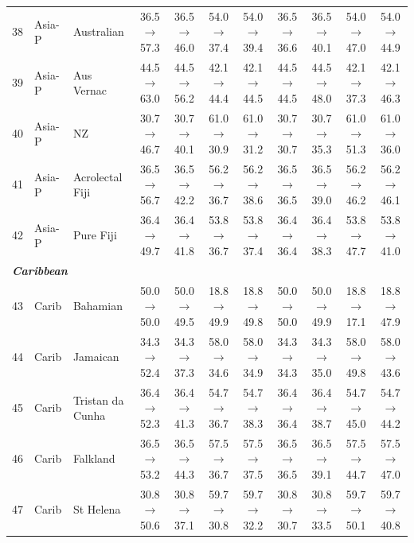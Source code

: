 \begin{table}[t]
{\begin{tabular}{rll c c c c c c c c}
38 & Asia-P & Australian & 36.5$\rightarrow$57.3 & 36.5$\rightarrow$46.0 & 54.0$\rightarrow$37.4 & 54.0$\rightarrow$39.4 & 36.5$\rightarrow$36.6 & 36.5$\rightarrow$40.1 & 54.0$\rightarrow$47.0 & 54.0$\rightarrow$44.9 \\
39 & Asia-P & Aus Vernac & 44.5$\rightarrow$63.0 & 44.5$\rightarrow$56.2 & 42.1$\rightarrow$44.4 & 42.1$\rightarrow$44.5 & 44.5$\rightarrow$44.5 & 44.5$\rightarrow$48.0 & 42.1$\rightarrow$37.3 & 42.1$\rightarrow$46.3 \\
40 & Asia-P & NZ & 30.7$\rightarrow$46.7 & 30.7$\rightarrow$40.1 & 61.0$\rightarrow$30.9 & 61.0$\rightarrow$31.2 & 30.7$\rightarrow$30.7 & 30.7$\rightarrow$35.3 & 61.0$\rightarrow$51.3 & 61.0$\rightarrow$36.0 \\
41 & Asia-P & Acrolectal Fiji & 36.5$\rightarrow$56.7 & 36.5$\rightarrow$42.2 & 56.2$\rightarrow$36.7 & 56.2$\rightarrow$38.6 & 36.5$\rightarrow$36.5 & 36.5$\rightarrow$39.0 & 56.2$\rightarrow$46.2 & 56.2$\rightarrow$46.1 \\
42 & Asia-P & Pure Fiji & 36.4$\rightarrow$49.7 & 36.4$\rightarrow$41.8 & 53.8$\rightarrow$36.7 & 53.8$\rightarrow$37.4 & 36.4$\rightarrow$36.4 & 36.4$\rightarrow$38.3 & 53.8$\rightarrow$47.7 & 53.8$\rightarrow$41.0 \\
\midrule
\multicolumn{11}{l}{\textit{\textbf{Caribbean}}} \\
43 & Carib & Bahamian & 50.0$\rightarrow$50.0 & 50.0$\rightarrow$49.5 & 18.8$\rightarrow$49.9 & 18.8$\rightarrow$49.8 & 50.0$\rightarrow$50.0 & 50.0$\rightarrow$49.9 & 18.8$\rightarrow$17.1 & 18.8$\rightarrow$47.9 \\
44 & Carib & Jamaican & 34.3$\rightarrow$52.4 & 34.3$\rightarrow$37.3 & 58.0$\rightarrow$34.6 & 58.0$\rightarrow$34.9 & 34.3$\rightarrow$34.3 & 34.3$\rightarrow$35.0 & 58.0$\rightarrow$49.8 & 58.0$\rightarrow$43.6 \\
45 & Carib & Tristan da Cunha & 36.4$\rightarrow$52.3 & 36.4$\rightarrow$41.3 & 54.7$\rightarrow$36.7 & 54.7$\rightarrow$38.3 & 36.4$\rightarrow$36.4 & 36.4$\rightarrow$38.7 & 54.7$\rightarrow$45.0 & 54.7$\rightarrow$44.2 \\
46 & Carib & Falkland & 36.5$\rightarrow$53.2 & 36.5$\rightarrow$44.3 & 57.5$\rightarrow$36.7 & 57.5$\rightarrow$37.5 & 36.5$\rightarrow$36.5 & 36.5$\rightarrow$39.1 & 57.5$\rightarrow$44.7 & 57.5$\rightarrow$47.0 \\
47 & Carib & St Helena & 30.8$\rightarrow$50.6 & 30.8$\rightarrow$37.1 & 59.7$\rightarrow$30.8 & 59.7$\rightarrow$32.2 & 30.8$\rightarrow$30.7 & 30.8$\rightarrow$33.5 & 59.7$\rightarrow$50.1 & 59.7$\rightarrow$40.8 \\

\end{tabular}}
\end{table}
